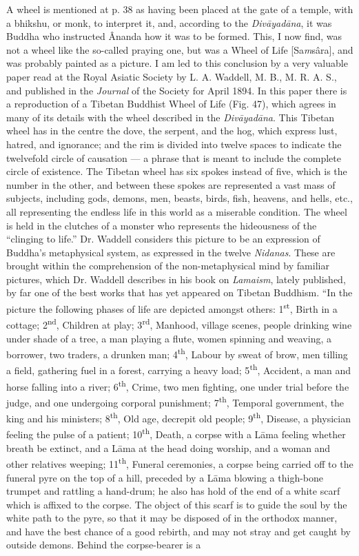 \documentclass[a4paper, 11pt, oneside, polutonikogreek, english]{article}
\begin{document}
A wheel is mentioned at p. 38 as having been placed at the gate of a temple, with a bhikshu, or monk, to interpret it, and, according to the \emph{Divāyadāna}, it was Buddha who instructed Ânanda how it was to be formed. This, I now find, was not a wheel like the so-called praying one, but was a Wheel of Life [Sa\emph{m}sâra], and was probably painted as a picture. I am led to this conclusion by a very valuable paper read at the Royal Asiatic Society by L. A. Waddell, M. B., M. R. A. S., and published in the \emph{Journal} of the Society for April 1894. In this paper there is a reproduction of a Tibetan Buddhist Wheel of Life (Fig. 47), which agrees in many of its details with the wheel described in the \emph{Divāyadāna}. This Tibetan wheel has in the centre the dove, the serpent, and the hog, which express lust, hatred, and ignorance; and the rim is divided into twelve spaces to indicate the twelvefold circle of causation --- a phrase that is meant to include the complete circle of existence. The Tibetan wheel has six spokes instead of five, which is the number in the other, and between these spokes are represented a vast mass of subjects, including gods, demons, men, beasts, birds, fish, heavens, and hells, etc., all representing the endless life in this world as a miserable condition. The wheel is held in the clutches of a monster who represents the hideousness of the ``clinging to life.'' Dr. Waddell considers this picture to be an expression of Buddha's metaphysical system, as expressed in the twelve \emph{Nidanas}. These are brought within the comprehension of the non-metaphysical mind by familiar pictures, which Dr. Waddell describes in his book on \emph{Lamaism}, lately published, by far one of the best works that has yet appeared on Tibetan Buddhism. ``In the picture the following phases of life are depicted amongst others: 1\textsuperscript{st}, Birth in a cottage; 2\textsuperscript{nd}, Children at play; 3\textsuperscript{rd}, Manhood, village scenes, people drinking wine under shade of a tree, a man playing a flute, women spinning and weaving, a borrower, two traders, a drunken man; 4\textsuperscript{th}, Labour by sweat of brow, men tilling a field, gathering fuel in a forest, carrying a heavy load; 5\textsuperscript{th}, Accident, a man and horse falling into a river; 6\textsuperscript{th}, Crime, two men fighting, one under trial before the judge, and one undergoing corporal punishment; 7\textsuperscript{th}, Temporal government, the king and his ministers; 8\textsuperscript{th}, Old age, decrepit old people; 9\textsuperscript{th}, Disease, a physician feeling the pulse of a patient; 10\textsuperscript{th}, Death, a corpse with a Lāma feeling whether breath be extinct, and a Lāma at the head doing worship, and a woman and other relatives weeping; 11\textsuperscript{th}, Funeral ceremonies, a corpse being carried off to the funeral pyre on the top of a hill, preceded by a Lāma blowing a thigh-bone trumpet and rattling a hand-drum; he also has hold of the end of a white scarf which is affixed to the corpse. The object of this scarf is to guide the soul by the white path to the pyre, so that it may be disposed of in the orthodox manner, and have the best chance of a good rebirth, and may not stray and get caught by outside demons. Behind the corpse-bearer is a 
\end{document}
